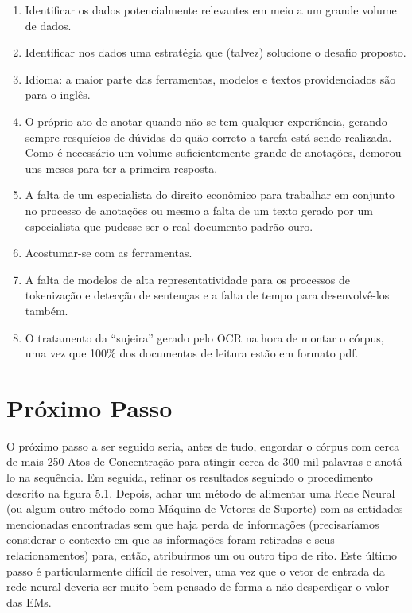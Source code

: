 \documentclass[11pt]{report}
\newcommand{\quotes}[1]{``#1''}
\begin{document}
\begin{enumerate}[label={\textbf{\arabic*.}}]
  \item Identificar os dados potencialmente relevantes em meio a um grande volume de dados.
  \item Identificar nos dados uma estratégia que (talvez) solucione o desafio proposto.
  \item Idioma: a maior parte das ferramentas, modelos e textos providenciados são para o inglês.
  \item O próprio ato de anotar quando não se tem qualquer experiência, gerando sempre resquícios de dúvidas do quão correto a tarefa está sendo realizada. Como é necessário
um volume suficientemente grande de anotações, demorou uns meses para ter a primeira resposta.
  \item A falta de um especialista do direito econômico para trabalhar em conjunto no processo de anotações ou mesmo a falta de um texto gerado por um especialista que pudesse ser
o real documento padrão-ouro.
  \item Acostumar-se com as ferramentas.
  \item A falta de modelos de alta representatividade para os processos de tokenização e detecção de sentenças e a falta de tempo para desenvolvê-los também.
  \item O tratamento da \quotes{sujeira} gerado pelo OCR na hora de montar o córpus, uma vez que 100\% dos documentos de leitura estão em formato pdf.
\end{enumerate}

\section{Próximo Passo}

\indent\indent O próximo passo a ser seguido seria, antes de tudo, engordar o córpus com cerca de mais 250 Atos de Concentração para atingir cerca de 300 mil palavras e anotá-lo
na sequência. Em seguida, refinar os resultados seguindo o procedimento descrito na figura 5.1. Depois, achar um método de alimentar uma Rede Neural (ou algum outro método como Máquina de
Vetores de Suporte) com as entidades mencionadas encontradas sem que haja perda de informações (precisaríamos considerar o contexto em que as informações foram retiradas e seus relacionamentos) para, então, atribuirmos um ou outro tipo de rito. Este último passo é particularmente difícil de resolver, uma vez que o vetor de entrada da rede neural deveria ser
muito bem pensado de forma a não desperdiçar o valor das EMs.
\end{document}
